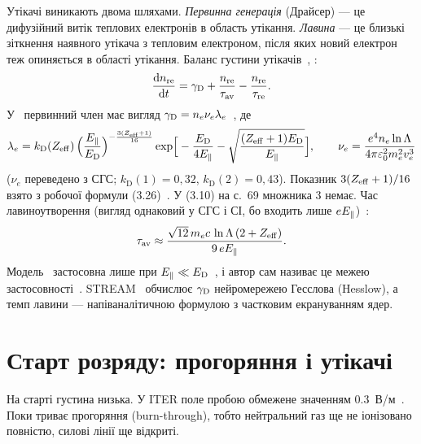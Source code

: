 Утікачі виникають двома шляхами. \emph{Первинна генерація} (Драйсер) --- це дифузійний
витік теплових електронів в область утікання. \emph{Лавина} --- це близькі зіткнення наявного утікача з
тепловим електроном, після яких новий електрон теж опиняється в області утікання. Баланс густини
утікачів~\cite[с.~10, (2.26)]{Hoppe2022}, \cite[с.~79, (3.14)]{Marchuk2025}:
\begin{equation}\label{eq:09-balance}
  \frac{\mathrm{d}n_{\mathrm{re}}}{\mathrm{d} t}=\gamma_{\mathrm{D}}+\frac{n_{\mathrm{re}}}{\tau_{\mathrm{av}}}-\frac{n_{\mathrm{re}}}{\tau_{\mathrm{re}}}.
\end{equation}
У~\cite{Marchuk2025} первинний член має вигляд $\gamma_{\mathrm{D}}=n_e\nu_e\lambda_e$~\cite[с.~69--70, (3.9)--(3.11)]{Marchuk2025},
де
\begin{equation}\label{eq:09-dreicer}
  \lambda_e=k_{\mathrm D}(Z_{\mathrm{eff}})\,\Big(\frac{E_{\parallel}}{E_{\mathrm{D}}}\Big)^{-\frac{3(Z_{\mathrm{eff}}+1)}{16}}
  \exp\!\Big[-\frac{E_{\mathrm{D}}}{4E_{\parallel}}-\sqrt{\frac{(Z_{\mathrm{eff}}+1)E_{\mathrm{D}}}{E_{\parallel}}}\Big],\qquad
  \nu_e=\frac{e^4n_e\ln\Lambda}{4\pi\varepsilon_0^2m_e^2v_e^3}
\end{equation}
($\nu_e$ переведено з СГС; $k_{\mathrm D}(1)=0{,}32$, $k_{\mathrm D}(2)=0{,}43$). Показник $3(Z_{\mathrm{eff}}+1)/16$
взято з робочої формули (3.26)~\cite[с.~84]{Marchuk2025}. У (3.10) на с.~69 множника 3 немає. Час
лавиноутворення (вигляд однаковий у СГС і СІ, бо входить лише $eE_{\parallel}$)~\cite[с.~71, (3.13)]{Marchuk2025}:
\begin{equation}\label{eq:09-tav}
  \tau_{\mathrm{av}}\approx\frac{\sqrt{12}\,m_ec\,\ln\Lambda\,(2+Z_{\mathrm{eff}})}{9\,eE_{\parallel}}.
\end{equation}
Модель~\cite{Marchuk2025} застосовна лише при $E_{\parallel}\ll E_{\mathrm{D}}$~\cite[с.~66, (3.1)]{Marchuk2025}, і автор сам
називає це межею застосовності~\cite[с.~92]{Marchuk2025}. STREAM~\cite[с.~10]{Hoppe2022} обчислює
$\gamma_{\mathrm{D}}$ нейромережею Гесслова (Hesslow), а темп лавини --- напіваналітичною формулою з частковим
екрануванням ядер.

\section{Старт розряду: прогоряння і утікачі}\label{sec:09-start}

На старті густина низька. У ITER поле пробою обмежене значенням \SI{0,3}{В/м}~\cite[с.~2]{Hoppe2022}.
Поки триває прогоряння (burn-through), тобто нейтральний газ ще не іонізовано повністю, силові лінії ще відкриті.

